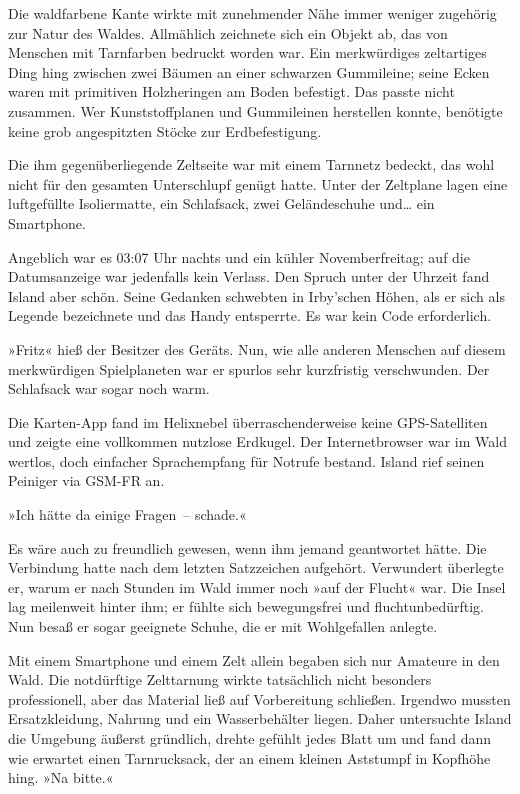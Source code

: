 Die waldfarbene Kante wirkte mit zunehmender Nähe immer weniger zugehörig zur Natur des Waldes. Allmählich zeichnete sich ein Objekt ab, das von Menschen mit Tarnfarben bedruckt worden war. Ein merkwürdiges zeltartiges Ding hing zwischen zwei Bäumen an einer schwarzen Gummileine; seine Ecken waren mit primitiven Holzheringen am Boden befestigt. Das passte nicht zusammen. Wer Kunststoffplanen und Gummileinen herstellen konnte, benötigte keine grob angespitzten Stöcke zur Erdbefestigung.

Die ihm gegenüberliegende Zeltseite war mit einem Tarnnetz bedeckt, das wohl nicht für den gesamten Unterschlupf genügt hatte. Unter der Zeltplane lagen eine luftgefüllte Isoliermatte, ein Schlafsack, zwei Geländeschuhe und… ein Smartphone.


Angeblich war es 03:07 Uhr nachts und ein kühler Novemberfreitag; auf die Datumsanzeige war jedenfalls kein Verlass. Den Spruch unter der Uhrzeit fand Island aber schön. Seine Gedanken schwebten in Irby’schen Höhen, als er sich als Legende bezeichnete und das Handy entsperrte. Es war kein Code erforderlich.

»Fritz« hieß der Besitzer des Geräts. Nun, wie alle anderen Menschen auf diesem merkwürdigen Spielplaneten war er spurlos sehr kurzfristig verschwunden. Der Schlafsack war sogar noch warm.

Die Karten-App fand im Helixnebel überraschenderweise keine GPS-Satelliten und zeigte eine vollkommen nutzlose Erdkugel. Der Internetbrowser war im Wald wertlos, doch einfacher Sprachempfang für Notrufe bestand. Island rief seinen Peiniger via GSM-FR an.


»Ich hätte da einige Fragen~– schade.«

Es wäre auch zu freundlich gewesen, wenn ihm jemand geantwortet hätte. Die Verbindung hatte nach dem letzten Satzzeichen aufgehört. Verwundert überlegte er, warum er nach Stunden im Wald immer noch »auf der Flucht« war. Die Insel lag meilenweit hinter ihm; er fühlte sich bewegungsfrei und fluchtunbedürftig. Nun besaß er sogar geeignete Schuhe, die er mit Wohlgefallen anlegte.

Mit einem Smartphone und einem Zelt allein begaben sich nur Amateure in den Wald. Die notdürftige Zelttarnung wirkte tatsächlich nicht besonders professionell, aber das Material ließ auf Vorbereitung schließen. Irgendwo mussten Ersatzkleidung, Nahrung und ein Wasserbehälter liegen. Daher untersuchte Island die Umgebung äußerst gründlich, drehte gefühlt jedes Blatt um und fand dann wie erwartet einen Tarnrucksack, der an einem kleinen Aststumpf in Kopfhöhe hing. »Na bitte.«

